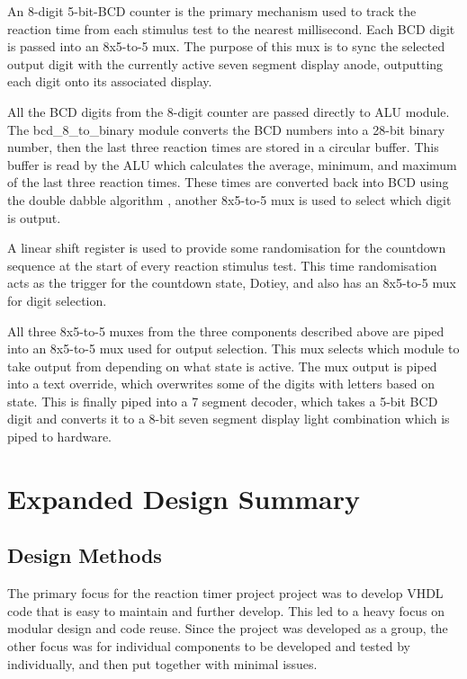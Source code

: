 \documentclass[11pt]{article}
\begin{document}
An 8-digit 5-bit-BCD counter is the primary mechanism used to track the reaction time from each stimulus test to the nearest millisecond. Each BCD digit is passed into an 8x5-to-5 mux. The purpose of this mux is to sync the selected output digit with the currently active seven segment display anode, outputting each digit onto its associated display.


All the BCD digits from the 8-digit counter are passed directly to ALU module. The bcd_8_to_binary module converts the BCD numbers into a 28-bit binary number, then the last three reaction times are stored in a circular buffer. This buffer is read by the ALU which calculates the average, minimum, and maximum of the last three reaction times. These times are converted back into BCD using the double dabble algorithm \cite{double_dabble}, another 8x5-to-5 mux is used to select which digit is output.

A linear shift register is used to provide some randomisation for the countdown sequence at the start of every reaction stimulus test. This time randomisation acts as the trigger for the countdown state, Dotiey, and also has an 8x5-to-5 mux for digit selection.

All three 8x5-to-5 muxes from the three components described above are piped into an 8x5-to-5 mux used for output selection. This mux selects which module to take output from depending on what state is active. The mux output is piped into a text override, which overwrites some of the digits with letters based on state. This is finally piped into a 7 segment decoder, which takes a 5-bit BCD digit and converts it to a 8-bit seven segment display light combination which is piped to hardware.

\section{Expanded Design Summary}

\subsection{Design Methods}

The primary focus for the reaction timer project project was to develop VHDL code that is easy to maintain and further develop. This led to a heavy focus on modular design and code reuse. Since the project was developed as a group, the other focus was for individual components to be developed and tested by individually, and then put together with minimal issues. 
\end{document}
